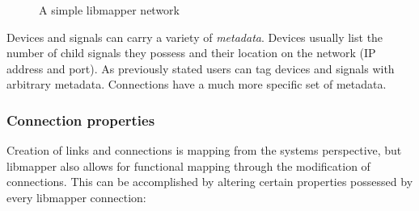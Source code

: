 \begin{figure}[ht]
\centering
\caption{A simple libmapper network}
\label{fig:libmapper_devices}
\end{figure}

Devices and signals can carry a variety of \emph{metadata}. Devices usually list the number of child signals they possess and their location on the network (IP address and port). As previously stated users can tag devices and signals with arbitrary metadata. Connections have a much more specific set of metadata.

	\subsubsection{Connection properties}

Creation of links and connections is mapping from the systems perspective, but libmapper also allows for functional mapping through the modification of connections. This can be accomplished by altering certain properties possessed by every libmapper connection:

